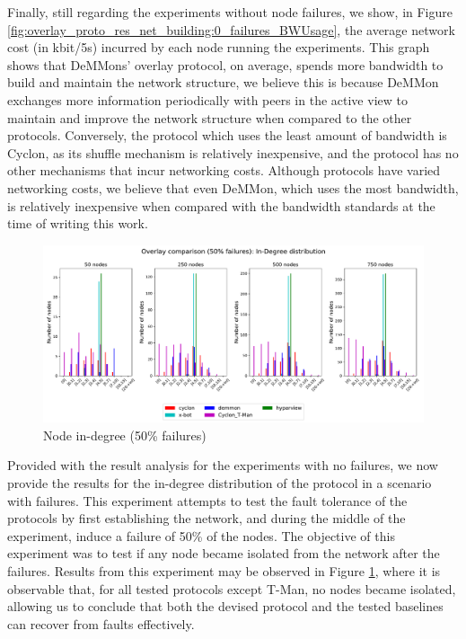 Finally, still regarding the experiments without node failures, we show, in Figure \ref{fig:overlay_proto_res_net_building:0_failures_BWUsage}, the average network cost (in kbit/5s) incurred by each node running the experiments. This graph shows that DeMMons' overlay protocol, on average, spends more bandwidth to build and maintain the network structure, we believe this is because DeMMon exchanges more information periodically with peers in the active view to maintain and improve the network structure when compared to the other protocols. Conversely, the protocol which uses the least amount of bandwidth is Cyclon, as its shuffle mechanism is relatively inexpensive, and the protocol has no other mechanisms that incur networking costs. Although protocols have varied networking costs, we believe that even DeMMon, which uses the most bandwidth, is relatively inexpensive when compared with the bandwidth standards at the time of writing this work.

\begin{figure}
    \centering
    \includegraphics[width=\linewidth]{Chapters/evaluation/figures/membership/membership_inDegree_50_failures.pdf}
    \caption{Node in-degree (50\% failures)}
    \label{fig:overlay_proto_res_net_building:50_failures_inDegree}
\end{figure}

Provided with the result analysis for the experiments with no failures, we now provide the results for the in-degree distribution of the protocol in a scenario with failures. This experiment attempts to test the fault tolerance of the protocols by first establishing the network, and during the middle of the experiment, induce a failure of 50\% of the nodes. The objective of this experiment was to test if any node became isolated from the network after the failures. Results from this experiment may be observed in Figure \ref{fig:overlay_proto_res_net_building:50_failures_inDegree}, where it is observable that, for all tested protocols except T-Man, no nodes became isolated, allowing us to conclude that both the devised protocol and the tested baselines can recover from faults effectively.

